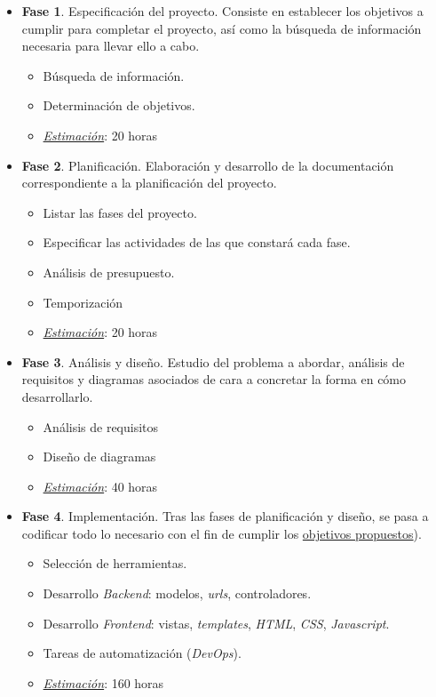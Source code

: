 \begin{itemize}
	\item \textbf{Fase 1}. Especificación del proyecto. Consiste en establecer los objetivos a cumplir para completar el proyecto, así como la búsqueda de información necesaria para llevar ello a cabo.
	\begin{itemize}
		\item Búsqueda de información.
		\item Determinación de objetivos.
		\item \underline{\textit{Estimación}}: 20 horas
	\end{itemize}
	
	\item \textbf{Fase 2}. Planificación. Elaboración y desarrollo de la documentación correspondiente a la planificación del proyecto.
	\begin{itemize}
		\item Listar las fases del proyecto.
		\item Especificar las actividades de las que constará cada fase.
		\item Análisis de presupuesto.
		\item Temporización
		\item \underline{\textit{Estimación}}: 20 horas
	\end{itemize}
	
	\item \textbf{Fase 3}. Análisis y diseño. Estudio del problema a abordar, análisis de requisitos y diagramas asociados de cara a concretar la forma en cómo desarrollarlo.
	\begin{itemize}
		\item Análisis de requisitos
		\item Diseño de diagramas
		\item \underline{\textit{Estimación}}: 40 horas
	\end{itemize}
	
	\item \textbf{Fase 4}. Implementación. Tras las fases de planificación y diseño, se pasa a codificar todo lo necesario con el fin de cumplir los \hyperref[cap:objetivos]{objetivos propuestos}).
	\begin{itemize}
		\item Selección de herramientas.
		\item Desarrollo \textit{Backend}: modelos, \textit{urls}, controladores.
		\item Desarrollo \textit{Frontend}: vistas, \textit{templates}, \textit{HTML}, \textit{CSS}, \textit{Javascript}.
		\item Tareas de automatización (\textit{DevOps}).
		\item \underline{\textit{Estimación}}: 160 horas
	\end{itemize}
	

\end{itemize}
